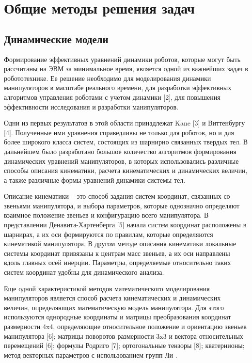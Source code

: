 \section{Общие методы решения задач}
\subsection{Динамические модели}

Формирование эффективных уравнений динамики роботов, которые могут быть рассчитаны на ЭВМ за минимальное время, является одной из важнейших задач в робототехнике. Ее решение необходимо для моделирования динамики манипуляторов в масштабе реального времени, для разработки эффективных алгоритмов управления роботами с учетом динамики [2], для повышения эффективности исследования и разработки манипуляторов.

Одни из первых результатов в этой области принадлежат Kane [3] и Виттенбургу [4]. Полученные ими уравнения справедливы не только для роботов, но и для более широкого класса систем, состоящих из шарнирно связанных твердых тел. В дальнейшем было разработано большое количество алгоритмов формирования динамических уравнений манипуляторов, в которых использовались различные способы описания кинематики, расчета кинематических и динамических величин, а также различные формы уравнений динамики системы тел.

Описание кинематики – это способ задания систем координат, связанных со звеньями манипулятора, и выбора параметров, которые однозначно определяют взаимное положение звеньев и конфигурацию всего манипулятора. В представлении Денавита-Хартенберга [5] начала систем координат расположены в шарнирах, а их оси формируются по правилам, которые определяются кинематикой манипулятора. В другом методе описания кинематики локальные системы координат привязаны к центрам масс звеньев, а их оси направлены вдоль главных осей инерции. Параметры, определяемые относительно таких систем координат удобны для динамического анализа.

Еще одной характеристикой методов математического моделирования манипуляторов является способ расчета кинематических и динамических величин, определяющих математическую модель манипулятора. Для этого используются однородные координаты и матрицы преобразования координат размерности 4x4, определяющие относительное положение и ориентацию звеньев манипулятора [6]; матрицы поворотов размерности 3x3 и вектора относительных перемещений [6]; формулы Родриго [7]; ортогональные тензоры [8]; кватернионы; метод векторных параметров с использованием групп Ли .

